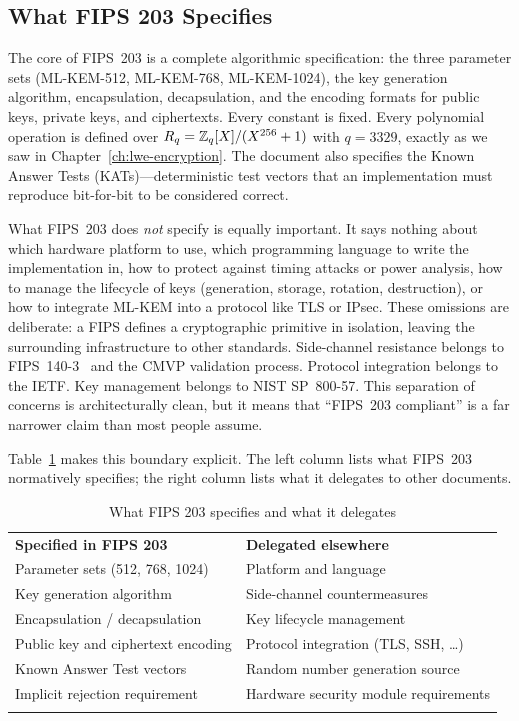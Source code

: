 \subsection{What FIPS 203 Specifies}
\label{subsec:fips203-specifies}

The core of FIPS~203 is a complete algorithmic specification: the three parameter sets (ML-KEM-512, ML-KEM-768, ML-KEM-1024), the key generation algorithm, encapsulation, decapsulation, and the encoding formats for public keys, private keys, and ciphertexts. Every constant is fixed. Every polynomial operation is defined over $R_q = \mathbb{Z}_q[X]/(X^{256}+1)$ with $q = 3329$, exactly as we saw in Chapter~\ref{ch:lwe-encryption}. The document also specifies the Known Answer Tests (KATs)---deterministic test vectors that an implementation must reproduce bit-for-bit to be considered correct.

What FIPS~203 does \emph{not} specify is equally important. It says nothing about which hardware platform to use, which programming language to write the implementation in, how to protect against timing attacks or power analysis, how to manage the lifecycle of keys (generation, storage, rotation, destruction), or how to integrate ML-KEM into a protocol like TLS or IPsec. These omissions are deliberate: a FIPS defines a cryptographic primitive in isolation, leaving the surrounding infrastructure to other standards. Side-channel resistance belongs to FIPS~140-3~\cite{FIPS140-3} and the CMVP validation process. Protocol integration belongs to the IETF. Key management belongs to NIST SP~800-57. This separation of concerns is architecturally clean, but it means that ``FIPS~203 compliant'' is a far narrower claim than most people assume.

Table~\ref{tab:fips203-scope} makes this boundary explicit. The left column lists what FIPS~203 normatively specifies; the right column lists what it delegates to other documents.

\begin{table}[t]
\caption{What FIPS 203 specifies and what it delegates}
\label{tab:fips203-scope}
\begin{tabular}{p{5.5cm}p{5.5cm}}
\hline\noalign{\smallskip}
\textbf{Specified in FIPS 203} & \textbf{Delegated elsewhere} \\
\noalign{\smallskip}\svhline\noalign{\smallskip}
Parameter sets (512, 768, 1024) & Platform and language \\
Key generation algorithm & Side-channel countermeasures \\
Encapsulation / decapsulation & Key lifecycle management \\
Public key and ciphertext encoding & Protocol integration (TLS, SSH, \ldots) \\
Known Answer Test vectors & Random number generation source \\
Implicit rejection requirement & Hardware security module requirements \\
\noalign{\smallskip}\hline
\end{tabular}
\end{table}

